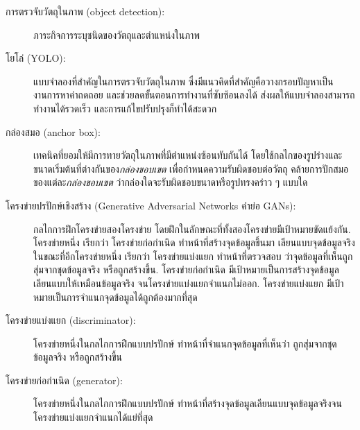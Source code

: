 \begin{description}
		
	
\item[การตรวจับวัตถุในภาพ (object detection):]
ภาระกิจการระบุชนิดของวัตถุและตำแหน่งในภาพ

\item[โยโล่ (YOLO):]
แบบจำลองที่สำคัญในการตรวจับวัตถุในภาพ ซึ่งมีแนวคิดที่สำคัญคือวางกรอบปัญหาเป็นงานการหาค่าถดถอย และช่วยลดขั้นตอนการทำงานที่ซับซ้อนลงได้
ส่งผลให้แบบจำลองสามารถทำงานได้รวดเร็ว และการแก้ไขปรับปรุงก็ทำได้สะดวก

\item[กล่องสมอ (anchor box):]
เทคนิคที่ยอมให้มีการทายวัตถุในภาพที่มีตำแหน่งซ้อนทับกันได้ 
โดยใช้กลไกของรูปร่างและขนาดเริ่มต้นที่ต่างกันของ\textit{กล่องขอบเขต} เพื่อกำหนดความรับผิดชอบต่อวัตถุ
คล้ายการปักสมอของแต่ละ\textit{กล่องขอบเขต} ว่ากล่องใดจะรับผิดชอบขนาดหรือรูปทรงคร่าว ๆ แบบใด

\item[โครงข่ายปรปักษ์เชิงสร้าง (Generative Adversarial Networks คำย่อ GANs):]
กลไกการฝึกโครงข่ายสองโครงข่าย โดยฝึกในลักษณะที่ทั้งสองโครงข่ายมีเป้าหมายขัดแย้งกัน.
โครงข่ายหนึ่ง เรียกว่า โครงข่ายก่อกำเนิด ทำหน้าที่สร้างจุดข้อมูลขึ้นมา เลียนแบบจุดข้อมูลจริง
ในขณะที่อีกโครงข่ายหนึ่ง เรียกว่า โครงข่ายแบ่งแยก ทำหน้าที่ตรวจสอบ ว่าจุดข้อมูลที่เห็นถูกสุ่มจากชุดข้อมูลจริง หรือถูกสร้างขึ้น.
โครงข่ายก่อกำเนิด มีเป้าหมายเป็นการสร้างจุดข้อมูลเลียนแบบให้เหมือนข้อมูลจริง จนโครงข่ายแบ่งแยกจำแนกไม่ออก.
โครงข่ายแบ่งแยก มีเป้าหมายเป็นการจำแนกจุดข้อมูลได้ถูกต้องมากที่สุด

\item[โครงข่ายแบ่งแยก (discriminator):]
โครงข่ายหนึ่งในกลไกการฝึกแบบปรปักษ์ ทำหน้าที่จำแนกจุดข้อมูลที่เห็นว่า ถูกสุ่มจากชุดข้อมูลจริง หรือถูกสร้างขึ้น

\item[โครงข่ายก่อกำเนิด (generator):]
โครงข่ายหนึ่งในกลไกการฝึกแบบปรปักษ์ ทำหน้าที่สร้างจุดข้อมูลเลียนแบบจุดข้อมูลจริงจนโครงข่ายแบ่งแยกจำแนกได้แย่ที่สุด


\end{description}
